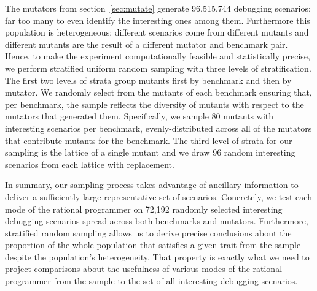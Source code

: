 

The mutators from section~\ref{sec:mutate} generate 96,515,744 debugging
scenarios; far too many to even identify the interesting ones among them.
Furthermore this population is heterogeneous; different scenarios come
from different mutants and different mutants are the result of a
different mutator and benchmark pair. Hence, to make the experiment
computationally feasible and statistically precise, we perform stratified
uniform random sampling with three levels of stratification.  The first
two levels of strata group mutants first by benchmark and then by mutator. 
We randomly select from the mutants of
each benchmark ensuring that, per
benchmark, the sample reflects the diversity of mutants with respect to
the mutators that generated them.  Specifically,  we sample 80 mutants
with interesting scenarios per benchmark,  evenly-distributed across all
of the mutators that contribute mutants for the benchmark.  The third
level of strata for our sampling is the lattice of a single mutant and we draw 96 random
interesting scenarios from each lattice with replacement.

In summary, our sampling process takes advantage of ancillary information
to deliver a  sufficiently large representative set of scenarios.
Concretely, we test each
mode of the rational programmer on 72,192 randomly selected interesting
debugging scenarios spread across both benchmarks and mutators.
Furthermore, stratified random sampling allows us to derive precise conclusions
about the proportion of the whole population that satisfies a given trait 
from the sample despite the population's heterogeneity.
That property is exactly what we need to project comparisons about the
usefulness of various modes of the
rational programmer from the sample to the set of all interesting debugging
scenarios.  
 



